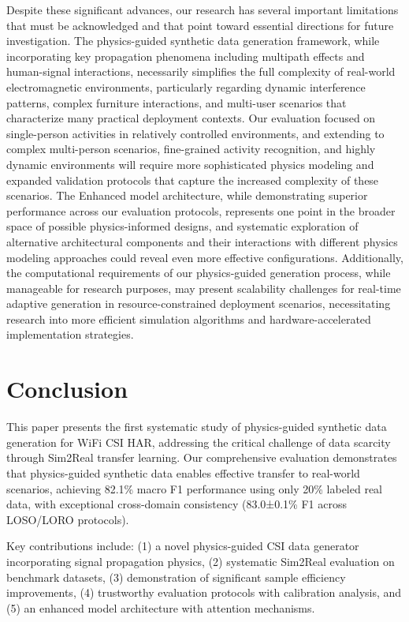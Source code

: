 \documentclass[journal]{IEEEtran}
\begin{document}
Despite these significant advances, our research has several important limitations that must be acknowledged and that point toward essential directions for future investigation. The physics-guided synthetic data generation framework, while incorporating key propagation phenomena including multipath effects and human-signal interactions, necessarily simplifies the full complexity of real-world electromagnetic environments, particularly regarding dynamic interference patterns, complex furniture interactions, and multi-user scenarios that characterize many practical deployment contexts. Our evaluation focused on single-person activities in relatively controlled environments, and extending to complex multi-person scenarios, fine-grained activity recognition, and highly dynamic environments will require more sophisticated physics modeling and expanded validation protocols that capture the increased complexity of these scenarios. The Enhanced model architecture, while demonstrating superior performance across our evaluation protocols, represents one point in the broader space of possible physics-informed designs, and systematic exploration of alternative architectural components and their interactions with different physics modeling approaches could reveal even more effective configurations. Additionally, the computational requirements of our physics-guided generation process, while manageable for research purposes, may present scalability challenges for real-time adaptive generation in resource-constrained deployment scenarios, necessitating research into more efficient simulation algorithms and hardware-accelerated implementation strategies.

\section{Conclusion}

This paper presents the first systematic study of physics-guided synthetic data generation for WiFi CSI HAR, addressing the critical challenge of data scarcity through Sim2Real transfer learning. Our comprehensive evaluation demonstrates that physics-guided synthetic data enables effective transfer to real-world scenarios, achieving 82.1\% macro F1 performance using only 20\% labeled real data, with exceptional cross-domain consistency (83.0±0.1\% F1 across LOSO/LORO protocols).

Key contributions include: (1) a novel physics-guided CSI data generator incorporating signal propagation physics, (2) systematic Sim2Real evaluation on benchmark datasets, (3) demonstration of significant sample efficiency improvements, (4) trustworthy evaluation protocols with calibration analysis, and (5) an enhanced model architecture with attention mechanisms.
\end{document}

